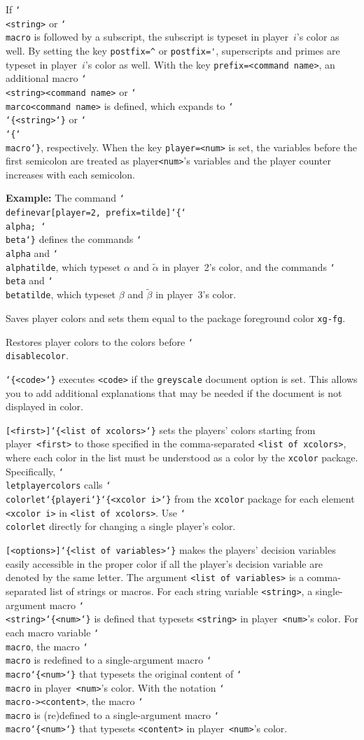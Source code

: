\documentclass{article}
\newenvironment{desc}{\itemize[leftmargin=50pt]}{\enditemize}
\def\macro#1{\item[\cmd{#1}]}
\def\macroarg#1#2{\item[\cmd{#1}] \hskip-2.5pt\texttt{#2}}
\renewcommand{\textbackslash}{\char`\\}
\def\cmd#1{\texttt{\color{cmd}\textbackslash#1}}
\def\leftbrace{\char`\{}
\def\rightbrace{\char`\}}
\def\arg#1{{\color{cmd}\leftbrace}{\color{black}#1}{\color{cmd}\rightbrace}}
\def\optarg[#1]{{\color{player1}[#1]}}
\begin{document}
\begin{desc}
If \cmd{<string>} or \cmd{macro} is followed by a subscript, the subscript is typeset in player~$i$'s color as well. By setting the key \texttt{postfix=}\verb|^| or \texttt{postfix=}\verb|'|, superscripts and primes are typeset in player~$i$'s color as well. With the key \texttt{prefix=<command name>}, an additional macro \cmd{<string><command name>} or \cmd{marco<command name>} is defined, which expands to \cmd{<command name>\arg{<string>}} or \cmd{<command name>\arg{\cmd{macro}}}, respectively.
%
When the key \texttt{player=<num>} is set, the variables before the first semicolon are treated as player\texttt{<num>}'s variables and the player counter increases with each semicolon.

{\color{player3}\textbf{Example:} The command \cmd{definevar\optarg[player=2, prefix=tilde]\arg{\cmd{alpha}; \cmd{beta}}} defines the commands \cmd{alpha} and \cmd{alphatilde}, which typeset $\alpha$ and $\tilde{\alpha}$ in player~2's color, and the commands \cmd{beta} and \cmd{betatilde}, which typeset $\beta$ and $\tilde{\beta}$ in player~3's color.}

\macro{disablecolor} Saves player colors and sets them equal to the package foreground color \texttt{xg-fg}.

\macro{enablecolor} Restores player colors to the colors before \cmd{disablecolor}.

\macroarg{ifgreyscale}{\arg{<code>}} executes \texttt{<code>} if the \texttt{greyscale} document option is set. This allows you to add additional explanations that may be needed if the document is not displayed in color.

\macroarg{letplayercolors}{\optarg[<first>]\arg{<list of xcolors>}} sets the players' colors starting from player~\texttt{<first>} to those specified in the comma-separated \texttt{<list of xcolors>}, where each color in the list must be understood as a color by the \texttt{xcolor} package. Specifically, \cmd{letplayercolors} calls \cmd{colorlet\arg{playeri}\arg{<xcolor i>}} from the \texttt{xcolor} package for each element \texttt{<xcolor i>} in \texttt{<list of xcolors>}. Use \cmd{colorlet} directly for changing a single player's color.

\macroarg{multivar}{\optarg[<options>]\arg{<list of variables>}} makes the players' decision variables easily accessible in the proper color if all the player's decision variable are denoted by the same letter. The argument \texttt{<list of variables>} is a comma-separated list of strings or macros. For each string variable \texttt{<string>}, a single-argument macro \cmd{<string>\arg{<num>}} is defined that typesets \texttt{<string>} in player~\texttt{<num>}'s color. For each macro variable \cmd{macro}, the macro \cmd{macro} is redefined to a single-argument macro \cmd{macro\arg{<num>}} that typesets the original content of \cmd{macro} in player~\texttt{<num>}'s color. With the notation \cmd{macro}\texttt{-><content>}, the macro \cmd{macro} is (re)defined to a single-argument macro \cmd{macro\arg{<num>}} that typesets \texttt{<content>} in player~\texttt{<num>}'s color. 


\end{desc}
\end{document}
